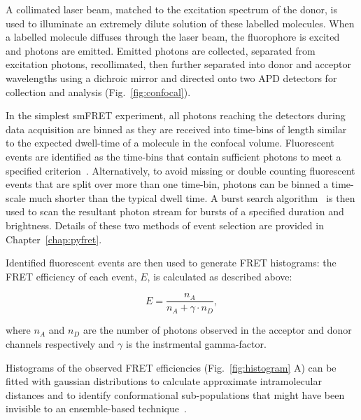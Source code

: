 A collimated laser beam, matched to the excitation spectrum of the donor, is used to illuminate an extremely dilute solution of these labelled molecules. When a labelled molecule diffuses through the laser beam, the fluorophore is excited and photons are emitted.  Emitted photons are collected, separated from excitation photons, recollimated, then further separated into donor and acceptor wavelengths using a dichroic mirror and directed onto two APD detectors for collection and analysis (Fig.~\ref{fig:confocal}).

In the simplest smFRET experiment, all photons reaching the detectors during data acquisition are binned as they are received into time-bins of length similar to the expected dwell-time of a molecule in the confocal volume. Fluorescent events are identified as the time-bins that contain sufficient photons to meet a specified criterion~\cite{weiss00}. Alternatively, to avoid missing or double counting fluorescent events that are split over more than one time-bin, photons can be binned a time-scale much shorter than the typical dwell time. A burst search algorithm~\cite{nir06} is then used to scan the resultant photon stream for bursts of a specified duration and brightness. Details of these two methods of event selection are provided in Chapter~\ref{chap:pyfret}.

Identified fluorescent events are then used to generate FRET histograms: the FRET efficiency of each event, $E$, is calculated as described above:

\begin{equation}
E = \frac{n_A}{n_A + \gamma \cdot n_D},
\label{eq:Eprod}
\end{equation} 

where $n_A$ and $n_D$ are the number of photons observed in the acceptor and donor channels respectively and $\gamma$ is the instrmental gamma-factor.

Histograms of the observed FRET efficiencies (Fig.~\ref{fig:histogram} A) can be fitted with gaussian distributions to calculate approximate intramolecular distances and to identify conformational sub-populations that might have been invisible to an ensemble-based technique~\cite{joo08, Walter2008}.

